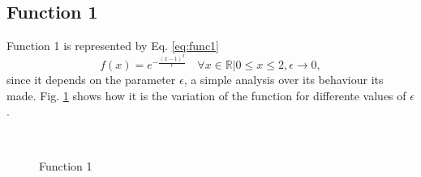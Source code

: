 \subsection{Function 1}
Function 1 is represented by Eq. \eqref{eq:func1} 
\begin{equation}
    \label{eq:func1}
    f(x) = e^{-\frac{(x-1)^2}{\epsilon}} \quad \forall x \in \mathbb{R} | 0 \leq x \leq 2, \epsilon\rightarrow 0,
\end{equation}
since it depends on the parameter $\epsilon$, a simple analysis over its behaviour its made. Fig. \ref{fig:func1} shows how it is the variation of the function for differente values of $\epsilon$.
\begin{figure}[H]
    \centering
    \hfill
    \\
    \hfill
    \caption{Function 1}
    \label{fig:func1}
\end{figure}

